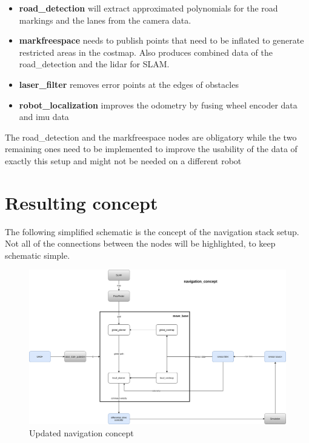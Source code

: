 \begin{itemize}
	\item \textbf{road\_detection} will extract approximated polynomials for the road markings and the lanes from the camera data.
	\item \textbf{markfreespace} needs to publish points that need to be inflated to generate restricted areas in the costmap. Also produces combined data of the road\_detection and the lidar for SLAM.
	\item \textbf{laser\_filter} removes error points at the edges of obstacles
	\item \textbf{robot\_localization} improves the odometry by fusing wheel encoder data and imu data
\end{itemize}

The road\_detection and the markfreespace nodes are obligatory while the two remaining ones need to be implemented to improve the usability of the data of exactly this setup and might not be needed on a different robot

\section{Resulting concept}
The following simplified schematic is the concept of the navigation stack setup. Not all of the connections between the nodes will be highlighted, to keep schematic simple.\\

\begin{figure}[h!]
	\begin{center}
		\includegraphics[width=140mm]{Pictures/Updated navigation concept}
		\caption[Updated navigation concept]{Updated navigation concept}
	\end{center}
\end{figure}



